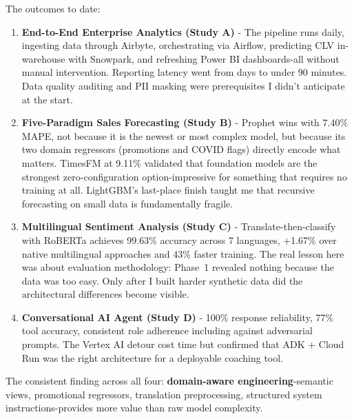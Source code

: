 \documentclass[11pt,a4paper]{article}
\begin{document}
The outcomes to date:

\begin{enumerate}[leftmargin=*,noitemsep,topsep=2pt]
    \item \textbf{End-to-End Enterprise Analytics (Study A)} - The pipeline runs daily, ingesting data through Airbyte, orchestrating via Airflow, predicting CLV in-warehouse with Snowpark, and refreshing Power BI dashboards-all without manual intervention. Reporting latency went from days to under 90 minutes. Data quality auditing and PII masking were prerequisites I didn't anticipate at the start.

    \item \textbf{Five-Paradigm Sales Forecasting (Study B)} - Prophet wins with 7.40\% MAPE, not because it is the newest or most complex model, but because its two domain regressors (promotions and COVID flags) directly encode what matters. TimesFM at 9.11\% validated that foundation models are the strongest zero-configuration option-impressive for something that requires no training at all. LightGBM's last-place finish taught me that recursive forecasting on small data is fundamentally fragile.

    \item \textbf{Multilingual Sentiment Analysis (Study C)} - Translate-then-classify with RoBERTa achieves 99.63\% accuracy across 7 languages, +1.67\% over native multilingual approaches and 43\% faster training. The real lesson here was about evaluation methodology: Phase~1 revealed nothing because the data was too easy. Only after I built harder synthetic data did the architectural differences become visible.

    \item \textbf{Conversational AI Agent (Study D)} - 100\% response reliability, 77\% tool accuracy, consistent role adherence including against adversarial prompts. The Vertex AI detour cost time but confirmed that ADK + Cloud Run was the right architecture for a deployable coaching tool.
\end{enumerate}

The consistent finding across all four: \textbf{domain-aware engineering}-semantic views, promotional regressors, translation preprocessing, structured system instructions-provides more value than raw model complexity.
\end{document}

